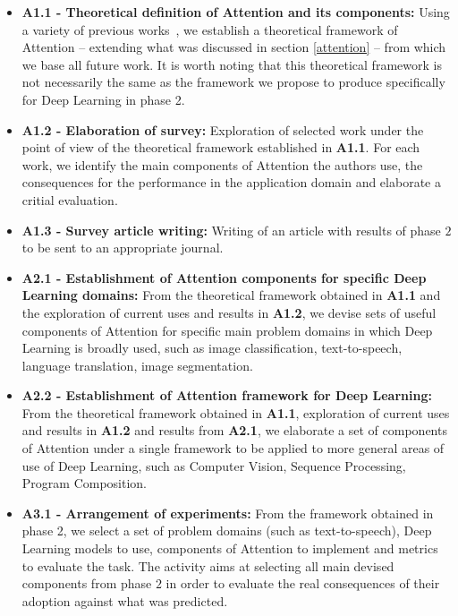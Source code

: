 \documentclass[English]{style/ic-tese-v3}
\begin{document}
\begin{itemize}
    \item \textbf{A1.1 - Theoretical definition of Attention and its components:}
        Using a variety of previous works~\cite{ref:helgason}\cite{ref:esther-thesis},
        we establish a theoretical framework of Attention
        -- extending what was discussed in section \ref{attention} --
        from which we base all future work.
        It is worth noting that this theoretical framework is not necessarily the same as the framework
        we propose to produce specifically for Deep Learning in phase 2.

    \item \textbf{A1.2 - Elaboration of survey:}
        Exploration of selected work under the point of view of the theoretical framework established
        in \textbf{A1.1}.
        For each work, we identify the main components of Attention the authors use, the consequences for the
        performance in the application domain and elaborate a critial evaluation.

    \item \textbf{A1.3 - Survey article writing:}
        Writing of an article with results of phase $2$ to be sent to an appropriate journal.

    \item \textbf{A2.1 - Establishment of Attention components for specific Deep Learning domains:}
        From the theoretical framework obtained in \textbf{A1.1}
        and the exploration of current uses and results in \textbf{A1.2},
        we devise sets of useful components of Attention for specific main problem domains
        in which Deep Learning is broadly used,
        such as image classification, text-to-speech, language translation, image segmentation.

    \item \textbf{A2.2 - Establishment of Attention framework for Deep Learning:}
        From the theoretical framework obtained in \textbf{A1.1},
        exploration of current uses and results in \textbf{A1.2} and
        results from \textbf{A2.1},
        we elaborate a set of components of Attention under a single framework to be applied to more
        general areas of use of Deep Learning,
        such as Computer Vision, Sequence Processing, Program Composition.

    \item \textbf{A3.1 - Arrangement of experiments:}
        From the framework obtained in phase 2, we select a set of problem domains (such as text-to-speech),
        Deep Learning models to use, components of Attention to implement and metrics to evaluate the task.
        The activity aims at selecting all main devised components from phase $2$ in order
        to evaluate the real consequences of their adoption against what was predicted.


\end{itemize}
\end{document}
